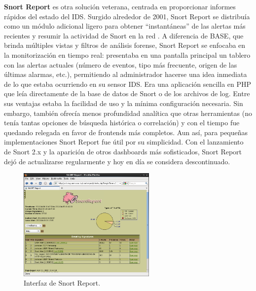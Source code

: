 \documentclass[11pt,a4paper,twoside]{report}
\begin{document}
\textbf{Snort Report} es otra solución veterana, centrada en proporcionar informes rápidos del estado del IDS. Surgido alrededor de 2001, Snort Report se distribuía como un módulo adicional ligero para obtener “instantáneas” de las alertas más recientes y resumir la actividad de Snort en la red \cite{SnortReport2010}. A diferencia de BASE, que brinda múltiples vistas y filtros de análisis forense, Snort Report se enfocaba en la monitorización en tiempo real: presentaba en una pantalla principal un tablero con las alertas actuales (número de eventos, tipo más frecuente, origen de las últimas alarmas, etc.), permitiendo al administrador hacerse una idea inmediata de lo que estaba ocurriendo en su sensor IDS. Era una aplicación sencilla en PHP que leía directamente de la base de datos de Snort o de los archivos de log. Entre sus ventajas estaba la facilidad de uso y la mínima configuración necesaria. Sin embargo, también ofrecía menos profundidad analítica que otras herramientas (no tenía tantas opciones de búsqueda histórica o correlación) y con el tiempo fue quedando relegada en favor de frontends más completos. Aun así, para pequeñas implementaciones Snort Report fue útil por su simplicidad. Con el lanzamiento de Snort 2.x y la aparición de otros dashboards más sofisticados, Snort Report dejó de actualizarse regularmente y hoy en día se considera descontinuado.

\begin{figure}[H]
	\centering
	\includegraphics[width=0.6\textwidth]{documento/19.png}
	\caption{Interfaz de Snort Report.}
	\label{fig:snort-report}
\end{figure}
\end{document}
